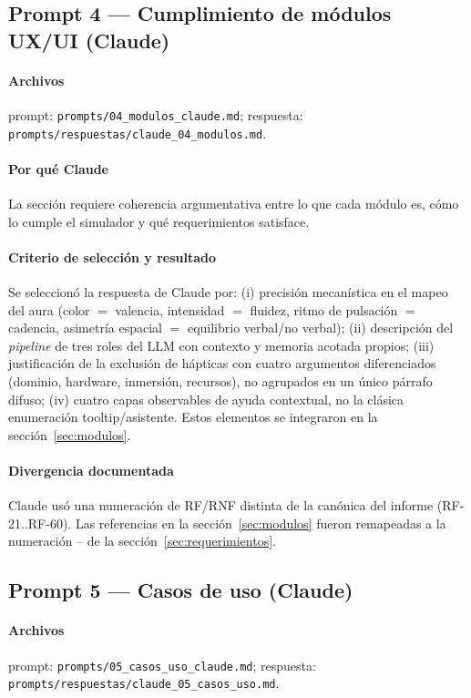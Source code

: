 \subsection{Prompt 4 --- Cumplimiento de módulos UX/UI (Claude)}
\paragraph{Archivos} prompt: \texttt{prompts/04\_modulos\_claude.md};
respuesta: \texttt{prompts/respuestas/claude\_04\_modulos.md}.

\paragraph{Por qué Claude} La sección requiere coherencia
argumentativa entre lo que cada módulo es, cómo lo cumple el
simulador y qué requerimientos satisface.

\paragraph{Criterio de selección y resultado} Se seleccionó la
respuesta de Claude por: (i) precisión mecanística en el mapeo del
aura (color $=$ valencia, intensidad $=$ fluidez, ritmo de pulsación
$=$ cadencia, asimetría espacial $=$ equilibrio verbal/no verbal);
(ii) descripción del \textit{pipeline} de tres roles del LLM con
contexto y memoria acotada propios; (iii) justificación de la
exclusión de hápticas con cuatro argumentos diferenciados (dominio,
hardware, inmersión, recursos), no agrupados en un único párrafo
difuso; (iv) cuatro capas observables de ayuda contextual, no la
clásica enumeración tooltip/asistente. Estos elementos se integraron
en la sección~\ref{sec:modulos}.

\paragraph{Divergencia documentada} Claude usó una numeración de
RF/RNF distinta de la canónica del informe (RF-21..RF-60). Las
referencias en la sección~\ref{sec:modulos} fueron remapeadas a la
numeración -- de la sección~\ref{sec:requerimientos}.

\subsection{Prompt 5 --- Casos de uso (Claude)}
\paragraph{Archivos} prompt: \texttt{prompts/05\_casos\_uso\_claude.md};
respuesta: \texttt{prompts/respuestas/claude\_05\_casos\_uso.md}.

